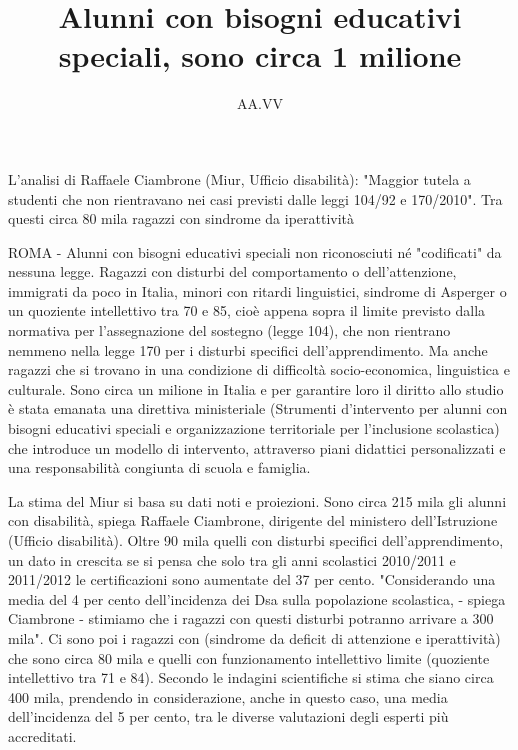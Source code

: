 \author{AA.VV}
\title{Alunni con bisogni educativi speciali, sono circa 1 milione}
\label{cha:CCH110613}
\maketitle
{}
L'analisi di Raffaele Ciambrone (Miur, Ufficio disabilità): "Maggior tutela a studenti che non rientravano nei casi previsti dalle leggi 104/92 e 170/2010". Tra questi circa 80 mila ragazzi con sindrome da iperattività

ROMA - Alunni con bisogni educativi speciali non riconosciuti né "codificati" da nessuna legge. Ragazzi con disturbi del comportamento o dell'attenzione, immigrati da poco in Italia, minori con ritardi linguistici, sindrome di Asperger o un quoziente intellettivo tra 70 e 85, cioè appena sopra il limite previsto dalla normativa per l'assegnazione del sostegno (legge 104), che non rientrano nemmeno nella legge 170 per i disturbi specifici dell'apprendimento. Ma anche ragazzi che si trovano in una condizione di difficoltà socio-economica, linguistica e culturale. Sono circa un milione in Italia e per garantire loro il diritto allo studio è stata emanata una direttiva ministeriale (Strumenti d'intervento per alunni con bisogni educativi speciali e organizzazione territoriale per l'inclusione scolastica) che introduce un modello di intervento, attraverso piani didattici personalizzati e una responsabilità congiunta di scuola e famiglia.

La stima del Miur si basa su dati noti e proiezioni. Sono circa 215 mila gli alunni con disabilità, spiega Raffaele Ciambrone, dirigente del ministero dell'Istruzione (Ufficio disabilità). Oltre 90 mila quelli con disturbi specifici dell'apprendimento, un dato in crescita se si pensa che solo tra gli anni scolastici 2010/2011 e 2011/2012 le certificazioni sono aumentate del 37 per cento. "Considerando una media del 4 per cento dell'incidenza dei Dsa sulla popolazione scolastica, - spiega Ciambrone - stimiamo che i ragazzi con questi disturbi potranno arrivare a 300 mila". Ci sono poi i ragazzi con   (sindrome da deficit di attenzione e iperattività) che sono circa 80 mila e quelli con funzionamento intellettivo limite (quoziente intellettivo tra 71 e 84). Secondo le indagini scientifiche si stima che siano circa 400 mila, prendendo in considerazione, anche in questo caso, una media dell'incidenza del 5 per cento, tra le diverse valutazioni degli esperti più accreditati.

